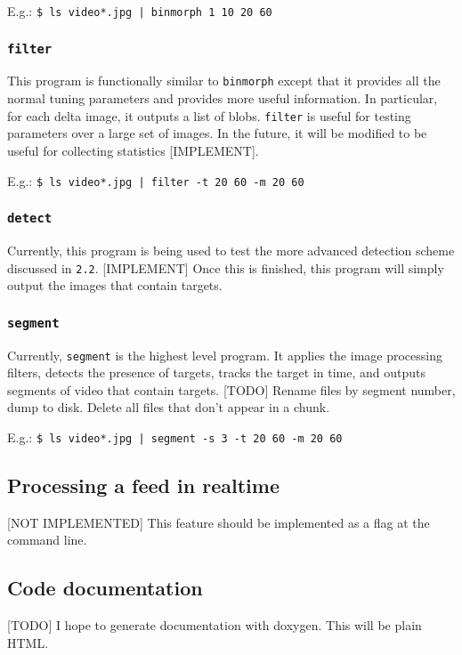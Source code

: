 \documentclass[letter]{article}
\begin{document}
E.g.: \texttt{\$ ls video*.jpg | binmorph 1 10 20 60}

\subsubsection{\texttt{filter}}
This program is functionally similar to \texttt{binmorph} except that it provides all 
the normal tuning parameters and provides more useful information. In particular, for 
each delta image, it outputs a list of blobs. \texttt{filter} is useful for testing 
parameters over a large set of images. In the future, it will be modified to be useful
for collecting statistics [IMPLEMENT].  

E.g.: \texttt{\$ ls video*.jpg | filter -t 20 60 -m 20 60}

\subsubsection{\texttt{detect}}
Currently, this program is being used to test the more advanced detection scheme 
discussed in \texttt{2.2}. [IMPLEMENT] Once this is finished, this program will 
simply output the images that contain targets. 

\subsubsection{\texttt{segment}}
Currently, \texttt{segment} is the highest level program. It applies the image 
processing filters, detects the presence of targets, tracks the target in time, 
and outputs segments of video that contain targets. [TODO] Rename files by 
segment number, dump to disk. Delete all files that don't appear in a chunk. 

E.g.: \texttt{\$ ls video*.jpg | segment -s 3 -t 20 60 -m 20 60}


\subsection{Processing a feed in realtime}
[NOT IMPLEMENTED] This feature should be implemented as a flag at the command line. 

\subsection{Code documentation}
[TODO] I hope to generate documentation with doxygen. This will be plain HTML. 
\end{document}
